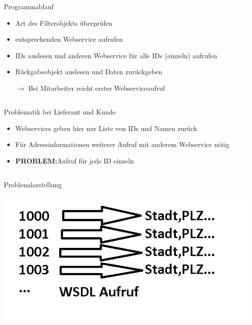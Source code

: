 \documentclass[xcolor={usenames,dvipsnames}, compress, 10pt]{beamer}
\begin{document}
\begin{frame}{Programmablauf}
\begin{center}

\begin{itemize}
\item Art des Filterobjekts überprüfen
\item entsprechenden Webservice aufrufen
\item IDs auslesen und anderen Webservice für alle IDs (einzeln) aufrufen
\item Rückgabeobjekt auslesen und Daten zurückgeben
\item[$\rightarrow$]Bei Mitarbeiter reicht erster Webserviceaufruf

\end{itemize}

\end{center}
\end{frame}

\subsection*{}

\begin{frame}{Problematik bei Lieferant und Kunde}
\begin{center}

\begin{itemize}
\item Webservices geben hier nur Liste von IDs und Namen zurück
\item Für Adressinformationen weiterer Aufruf mit anderem Webservice nötig
\item \textbf{PROBLEM:}Aufruf für jede ID einzeln
\end{itemize}

\end{center}
\end{frame}

\subsection*{}

\begin{frame}{Problemdarstellung}
\begin{center}

\includegraphics[width=\textheight]{Bilder/presi1.png} 

\end{center}
\end{frame}
\end{document}
